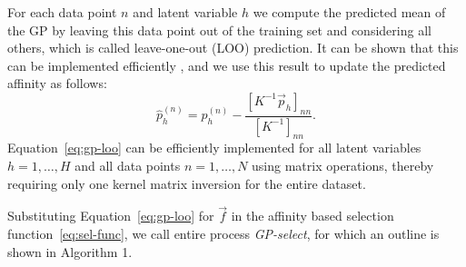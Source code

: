 For each data point $n$ and latent variable $h$ we compute the predicted mean of the GP by leaving 
this data point out of the training set and considering all others, which is called leave-one-out (LOO) prediction.
It can be shown that this can be implemented efficiently \citep[see Section 5.4.2 in ][]{RasmussenGPbook}, 
and we use this result to update the predicted affinity as follows:
%
%
\vspace{-.2cm}  %
\begin{equation}\label{eq:gp-loo}
\hat{p}_{h}^{(n)} =   
p_{h}^{(n)} - \frac{ [ K^{-1} \vec{p}_{h} ]_{nn} }{ [ K^{-1} ]_{nn} }.
\end{equation}
%
%
Equation~\eqref{eq:gp-loo} can be efficiently implemented for all latent variables $h=1,\dots,H$ and all data points $n=1,\dots,N$ using matrix operations, thereby requiring only one kernel matrix inversion for the entire dataset.
%
%
%

Substituting Equation~\eqref{eq:gp-loo} for $\vec{f}$ in the affinity based selection function~\eqref{eq:sel-func}, 
we call entire process \textit{GP-select}, for which an outline is shown in Algorithm 1.


